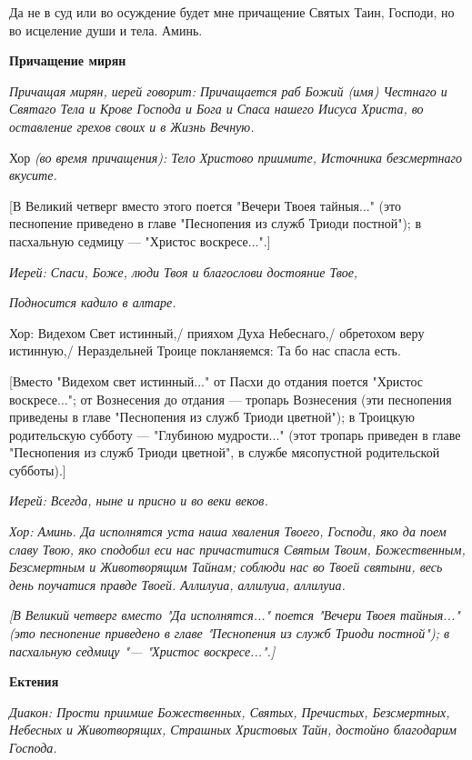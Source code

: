   Да не в суд или во осуждение будет мне причащение Святых Таин, Господи, но во исцеление души и тела. Аминь.


\medskip


\bfseries Причащение мирян\normalfont{} 


\itshape  Причащая мирян, иерей говори\normalfont{}т: Причащается раб Божий (имя) Честнаго и Святаго Тела и Крове Господа и Бога и Спаса нашего Иисуса Христа, во оставление грехов своих и в Жизнь Вечную. 


Хор \itshape (во время причащения)\normalfont{}: Тело Христово приимите, Источника безсмертнаго вкусите.


 [В Великий четверг вместо этого поется "Вечери Твоея тайныя..." (это песнопение приведено в главе "Песнопения из служб Триоди постной"); в пасхальную седмицу — "Христос воскресе...".]


 \itshape Иерей:\normalfont{} Спаси, Боже, люди Твоя и благослови достояние Твое, 


\itshape Подносится кадило в алтаре.\normalfont{} 


      Хор: Видехом Свет истинный,/ прияхом Духа Небеснаго,/ обретохом веру истинную,/ Нераздельней Троице покланяемся: Та бо нас спасла есть.


      [Вместо "Видехом свет истинный..." от Пасхи до отдания поется "Христос воскресе..."; от Вознесения до отдания — тропарь Вознесения (эти песнопения приведены в главе "Песнопения из служб Триоди цветной"); в Троицкую родительскую субботу — "Глубиною мудрости..." (этот тропарь приведен в главе "Песнопения из служб Триоди цветной", в службе мясопустной родительской субботы).]


\itshape  Иерей:\normalfont{} Всегда, ныне и присно и во веки веков.


\itshape  Хор:\normalfont{} Аминь. Да исполнятся уста наша хваления Твоего, Господи, яко да поем славу Твою, яко сподобил еси нас причаститися Святым Твоим, Божественным, Безсмертным и Животворящим Тайнам; соблюди нас во Твоей святыни, весь день поучатися правде Твоей. Аллилуиа, аллилуиа, аллилуиа. 


\itshape [В Великий четверг вмест\normalfont{}о "Да исполнятся..." поется "Вечери Твоея тайныя..." (это песнопение приведено в главе "Песнопения из служб Триоди постной"); в пасхальную седмицу "--- "Христос воскресе...".]


\medskip


 \bfseries Ектения \normalfont{}


\itshape  Диакон:\normalfont{} Прости приимше Божественных, Святых, Пречистых, Безсмертных, Небесных и Животворящих, Страшных Христовых Тайн, достойно благодарим Господа. \itshape 


